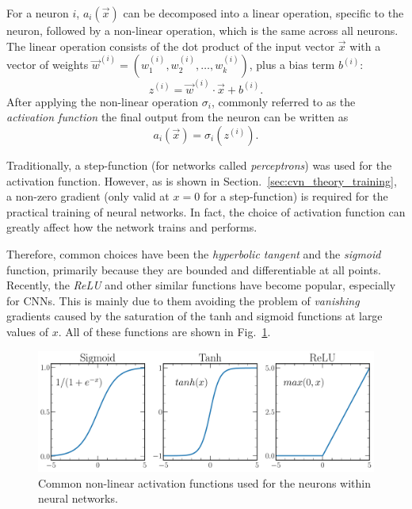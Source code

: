 For a neuron $i$, $a_{i}(\vec{x})$ can be decomposed into a linear operation, specific to the
neuron, followed by a non-linear operation, which is the same across all neurons. The linear
operation consists of the dot product of the input vector $\vec{x}$ with a vector of weights
$\vec{w}^{(i)} = (w_{1}^{(i)}, w_{2}^{(i)},\dots,w_{k}^{(i)})$, plus a bias term $b^{(i)}$:
\begin{equation} %
    z^{(i)}=\vec{w}^{(i)}\cdot\vec{x}+b^{(i)}.
    \label{eq:network}
\end{equation}
After applying the non-linear operation $\sigma_{i}$, commonly referred to as the \emph{activation
    function} the final output from the neuron can be written as
\begin{equation} %
    a_{i}(\vec{x})=\sigma_{i}(z^{(i)}).
    \label{eq:activation}
\end{equation}

Traditionally, a step-function (for networks called \emph{perceptrons}) was used for the
activation function. However, as is shown in Section.~\ref{sec:cvn_theory_training}, a non-zero
gradient (only valid at $x=0$ for a step-function) is required for the practical training of
neural networks. In fact, the choice of activation function can greatly affect how the network
trains and performs.

Therefore, common choices have been the \emph{hyperbolic tangent} and the \emph{sigmoid} function,
primarily because they are bounded and differentiable at all points. Recently, the \emph{ReLU} and
other similar functions have become popular, especially for CNNs. This is mainly due to them
avoiding the problem of \emph{vanishing} gradients caused by the saturation of the tanh and
sigmoid functions at large values of $x$. All of these functions are shown in
Fig.~\ref{fig:activations}.

\begin{figure} %
    \includegraphics[width=\textwidth]{diagrams/6-cvn/activations.pdf}
    \caption[Common non-linear activation functions.]
    {Common non-linear activation functions used for the neurons within neural networks.}
    \label{fig:activations}
\end{figure}

